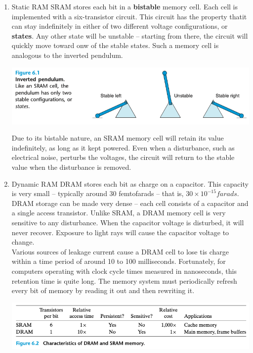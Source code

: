 \documentclass[11pt]{article}
\begin{document}
\begin{enumerate}
\item Static RAM
\label{sec:org548bba9}
SRAM stores each bit in a \textbf{bistable} memory cell. Each cell is implemented with a six-transistor circuit. This circuit has the property thatit can stay indefinitely in either of two different voltage configurations, or \textbf{states}. Any other state will be unstable -- starting from there, the circuit will quickly move toward onw of the stable states. Such a memory cell is analogous to the inverted pendulum.\\

\begin{center}
\includegraphics[width=.9\linewidth]{pics/figure6.1-inverted-pendulum.png}
\end{center}


Due to its bistable nature, an SRAM memory cell will retain its value indefinitely, as long as it kept powered. Even when a disturbance, such as electrical noise, perturbs the voltages, the circuit will return to the stable value when the disturbance is removed.\\

\item Dynamic RAM
\label{sec:org931b952}
DRAM stores each bit as charge on a capacitor. This capacity is very small -- typically around 30 femtofarads -- that is, \(30 \times 10^{-15} farads\). DRAM storage can be made very dense -- each cell consists of a capacitor and a single access transistor. Unlike SRAM, a DRAM memory cell is very sensitive to any disturbance. When the capacitor voltage is disturbed, it will never recover. Exposure to light rays will cause the capacitor voltage to change.\\

Various sources of leakage current cause a DRAM cell to lose tis charge within a time period of around 10 to 100 milliseconds. Fortunately, for computers operating with clock cycle times measured in nanoseconds, this retention time is quite long. The memory system must periodically refresh every bit of memory by reading it out and then rewriting it.\\

\begin{center}
\includegraphics[width=.9\linewidth]{pics/figure6.2-characteristics-of-dram-and-sram-memory.png}
\end{center}



\end{enumerate}
\end{document}
